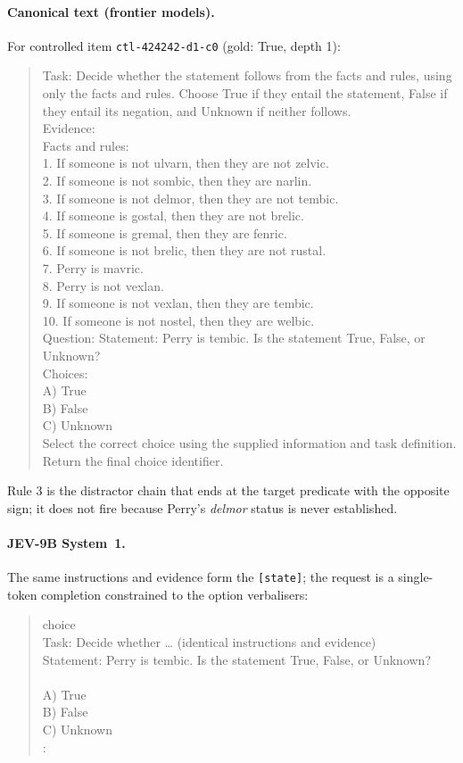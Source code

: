 \paragraph{Canonical text (frontier models).} For controlled item \texttt{ctl-424242-d1-c0} (gold: True, depth 1):
\begin{quote}\footnotesize\ttfamily
Task: Decide whether the statement follows from the facts and rules, using only the facts and rules. Choose True if they entail the statement, False if they entail its negation, and Unknown if neither follows.\\[3pt]
Evidence:\\
Facts and rules:\\
1. If someone is not ulvarn, then they are not zelvic.\\
2. If someone is not sombic, then they are narlin.\\
3. If someone is not delmor, then they are not tembic.\\
4. If someone is gostal, then they are not brelic.\\
5. If someone is gremal, then they are fenric.\\
6. If someone is not brelic, then they are not rustal.\\
7. Perry is mavric.\\
8. Perry is not vexlan.\\
9. If someone is not vexlan, then they are tembic.\\
10. If someone is not nostel, then they are welbic.\\[3pt]
Question: Statement: Perry is tembic. Is the statement True, False, or Unknown?\\[3pt]
Choices:\\
A) True\\
B) False\\
C) Unknown\\[3pt]
Select the correct choice using the supplied information and task definition. Return the final choice identifier.
\end{quote}
Rule 3 is the distractor chain that ends at the target predicate with the opposite sign; it does not fire because Perry's \textit{delmor} status is never established.

\paragraph{JEV-9B System~1.} The same instructions and evidence form the \texttt{[state]}; the request is a single-token completion constrained to the option verbalisers:
\begin{quote}\footnotesize\ttfamily
[kind] choice\\
[state] Task: Decide whether \ldots{} (identical instructions and evidence)\\
[question] Statement: Perry is tembic. Is the statement True, False, or Unknown?\\
[options]\\
A) True\\ B) False\\ C) Unknown\\
[decision]:
\end{quote}

